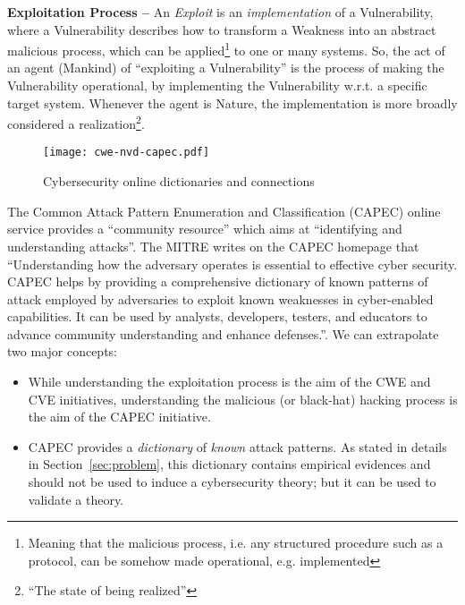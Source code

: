 \begin{definition}{\bf Exploitation Process --} An \emph{Exploit} is an \emph{implementation} of
a Vulnerability, where a Vulnerability describes how to transform a
Weakness into an abstract malicious process, which can be applied\footnote{Meaning that the
malicious process, i.e.  any structured procedure such as a protocol, can be
somehow made operational, e.g. implemented} to one or many systems. So, the act
of an agent (Mankind) of ``exploiting a Vulnerability'' is the process of
making the Vulnerability operational, by implementing the Vulnerability w.r.t.
a specific target system.  Whenever the agent is Nature, the implementation is
more broadly considered a realization\footnote{``The state of being
realized''\autocite{Merriam2020realization}}. 
\end{definition}

\begin{figure}[t]
	\centering
	\texttt{[image: cwe-nvd-capec.pdf]}
	\caption{Cybersecurity online dictionaries and connections}
	\label{fig:cwe-nvd-capec}
\end{figure}

The Common Attack Pattern Enumeration and
Classification\autocite{MITRE2020CAPEC} (CAPEC) online service provides a
``community resource'' which aims at ``identifying and understanding attacks''.
The MITRE writes on the CAPEC homepage that ``Understanding how the adversary
operates is essential to effective cyber security. CAPEC helps by providing a
comprehensive dictionary of known patterns of attack employed by adversaries to
exploit known weaknesses in cyber-enabled capabilities. It can be used by
analysts, developers, testers, and educators to advance community understanding
and enhance defenses.''. We can extrapolate two major concepts: 
\begin{itemize}
	\item While understanding the exploitation process is the aim of the
		CWE and CVE initiatives, understanding the malicious (or black-hat) hacking process is
		the aim of the CAPEC initiative.
	\item CAPEC provides a \emph{dictionary} of \emph{known} attack patterns.
		As stated in details in Section~\ref{sec:problem}, this dictionary contains
		empirical evidences and should not be used to induce a cybersecurity 
		theory; but it can be used to validate a theory.
\end{itemize}

